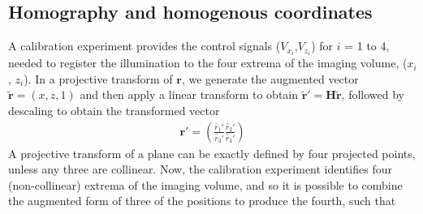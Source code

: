 
\subsection{Homography and homogenous coordinates}

A calibration experiment provides the control signals ($V_{x_i}$,$V_{z_i}$) for $i$ = 1 to 4, needed to register the illumination to the four extrema of the imaging volume, ($x_i$, $z_i$).
In a projective transform of $\textbf{r}$, we generate the augmented vector $\widetilde{\textbf{r}} = (x, z, 1)$%
and then apply a linear transform to obtain $\widetilde{\textbf{r}}' = \textbf{H} \widetilde{\textbf{r}}$, followed by descaling to obtain the transformed vector
\begin{align}
{\textbf{r}}' = \left(\frac{{\widetilde{r_1}}'}{{\widetilde{r_3}}'}\frac{{\widetilde{r_2}}'}{{\widetilde{r_3}}'}\right) %
\end{align}
A projective transform of a plane can be exactly defined by four projected points, unless any three are collinear.
Now, the calibration experiment identifies four (non-collinear) extrema of the imaging volume, and so it is possible to combine the augmented form of three of the positions to produce the fourth, such that

